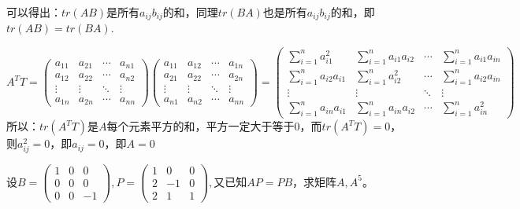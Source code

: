 \documentclass[a4paper]{report}
\begin{document}
\begin{zhengming}
可以得出：$tr(AB)$是所有$a_{ij}b_{ij}$的和，同理$tr(BA)$也是所有$a_{ij}b_{ij}$的和，即$tr(AB)=tr(BA)$.

\begin{equation*}
A^{T}T=\begin{pmatrix}
a_{11}&a_{21}&\cdots&a_{n1}\\
a_{12}&a_{22}&\cdots&a_{n2}\\
\vdots&\vdots&\ddots&\vdots\\
a_{1n}&a_{2n}&\cdots&a_{nn}
\end{pmatrix}\begin{pmatrix}
a_{11}&a_{12}&\cdots&a_{1n}\\
a_{21}&a_{22}&\cdots&a_{2n}\\
\vdots&\vdots&\ddots&\vdots\\
a_{n1}&a_{n2}&\cdots&a_{nn}
\end{pmatrix}=\begin{pmatrix}
\sum_{i=1}^{n}a_{i1}^2&\sum_{i=1}^{n}a_{i1}a_{i2}&\cdots&\sum_{i=1}^{n}a_{i1}a_{in}\\
\sum_{i=1}^{n}a_{i2}a_{i1}&\sum_{i=1}^{n}a_{i2}^2&\cdots&\sum_{i=1}^{n}a_{i2}a_{in}\\
\vdots&\vdots&\ddots&\vdots\\
\sum_{i=1}^{n}a_{in}a_{i1}&\sum_{i=1}^{n}a_{in}a_{i2}&\cdots&\sum_{i=1}^{n}a_{in}^2
\end{pmatrix}
\end{equation*}
所以：$tr(A^{T}T)$是$A$每个元素平方的和，平方一定大于等于0，而$tr(A^{T}T)=0$，则$a_{ij}^2=0$，即$a_{ij}=0$，即$A=0$
\end{zhengming}

\EX 设$
B=
\begin{pmatrix}
1&0&0\\
0&0&0\\
0&0&-1
\end{pmatrix},
P=
\begin{pmatrix}
1&0&0\\
2&-1&0\\
2&1&1
\end{pmatrix},$又已知$AP=PB$，求矩阵$A,A^5$。
\end{document}
